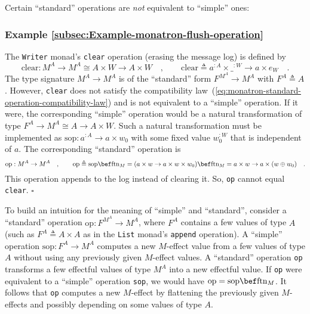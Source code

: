 Certain \textsf{``}standard\textsf{''} operations are \emph{not} equivalent to \textsf{``}simple\textsf{''}
ones:

\subsubsection{Example \label{subsec:Example-monatron-flush-operation}\ref{subsec:Example-monatron-flush-operation}}

The \lstinline!Writer! monad\textsf{'}s \lstinline!clear! operation (erasing
the message log) is defined by
\[
\text{clear}:M^{A}\rightarrow M^{A}\cong A\times W\rightarrow A\times W\quad,\quad\quad\text{clear}\triangleq a^{:A}\times\_^{:W}\rightarrow a\times e_{W}\quad.
\]
The type signature $M^{A}\rightarrow M^{A}$ is of the \textsf{``}standard\textsf{''}
form $F^{M^{A}}\rightarrow M^{A}$ with $F^{A}\triangleq A$. However,
\lstinline!clear! does not satisfy the compatibility law~(\ref{eq:monatron-standard-operation-compatibility-law})
and is not equivalent to a \textsf{``}simple\textsf{''} operation. If it were, the
corresponding \textsf{``}simple\textsf{''} operation would be a natural transformation
of type $F^{A}\rightarrow M^{A}\cong A\rightarrow A\times W$. Such
a natural transformation must be implemented as $\text{sop}:a^{:A}\rightarrow a\times w_{0}$
with some fixed value $w_{0}^{:W}$ that is independent of $a$. The
corresponding \textsf{``}standard\textsf{''} operation is 
\[
\text{op}:M^{A}\rightarrow M^{A}\quad,\quad\quad\text{op}\triangleq\text{sop}\bef\text{ftn}_{M}=(a\times w\rightarrow a\times w\times w_{0})\bef\text{ftn}_{M}=a\times w\rightarrow a\times(w\oplus w_{0})\quad.
\]
This operation appends to the log instead of clearing it. So, \lstinline!op!
cannot equal \lstinline!clear!. $\square$

To build an intuition for the meaning of \textsf{``}simple\textsf{''} and \textsf{``}standard\textsf{''},
consider a \textsf{``}standard\textsf{''} operation $\text{op}:F^{M^{A}}\rightarrow M^{A}$,
where $F^{A}$ contains a few values of type $A$ (such as $F^{A}\triangleq A\times A$
as in the \lstinline!List! monad\textsf{'}s \lstinline!append! operation).
A \textsf{``}simple\textsf{''} operation $\text{sop}:F^{A}\rightarrow M^{A}$ computes
a new $M$-effect value from a few values of type $A$ without using
any previously given $M$-effect values. A \textsf{``}standard\textsf{''} operation
\lstinline!op! transforms a few effectful values of type $M^{A}$
into a new effectful value. If \lstinline!op! were equivalent to
a \textsf{``}simple\textsf{''} operation \lstinline!sop!, we would have $\text{op}=\text{sop}\bef\text{ftn}_{M}$.
It follows that \lstinline!op! computes a new $M$-effect by flattening
the previously given $M$-effects and possibly depending on some values
of type $A$. 

